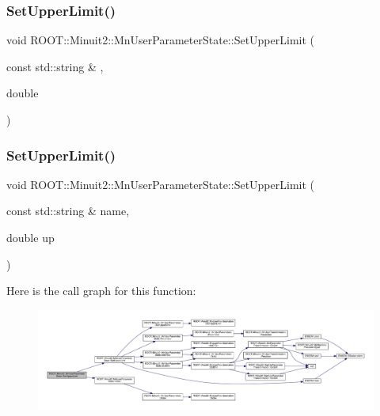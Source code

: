\subsubsection{\texorpdfstring{SetUpperLimit()}{SetUpperLimit()}\hspace{0.1cm}{\footnotesize\ttfamily [3/4]}}
{\footnotesize\ttfamily void R\+O\+O\+T\+::\+Minuit2\+::\+Mn\+User\+Parameter\+State\+::\+Set\+Upper\+Limit (\begin{DoxyParamCaption}\item[{const std\+::string \&}]{,  }\item[{double}]{ }\end{DoxyParamCaption})}

\mbox{\label{classROOT_1_1Minuit2_1_1MnUserParameterState_ab61a4e78b23aa76315662cf9bd07a012}} 
\subsubsection{\texorpdfstring{SetUpperLimit()}{SetUpperLimit()}\hspace{0.1cm}{\footnotesize\ttfamily [4/4]}}
{\footnotesize\ttfamily void R\+O\+O\+T\+::\+Minuit2\+::\+Mn\+User\+Parameter\+State\+::\+Set\+Upper\+Limit (\begin{DoxyParamCaption}\item[{const std\+::string \&}]{name,  }\item[{double}]{up }\end{DoxyParamCaption})}

Here is the call graph for this function\+:\nopagebreak
\begin{figure}[H]
\begin{center}
\leavevmode
\includegraphics[width=350pt]{d3/de0/classROOT_1_1Minuit2_1_1MnUserParameterState_ab61a4e78b23aa76315662cf9bd07a012_cgraph}
\end{center}
\end{figure}
\mbox{\label{classROOT_1_1Minuit2_1_1MnUserParameterState_a90490f6f1ab718c8dae1c895d36baf65}} 
